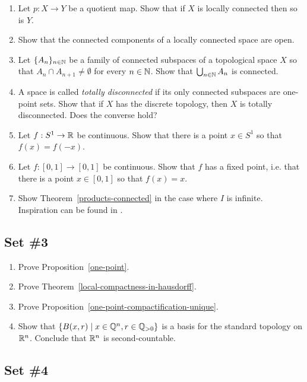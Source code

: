 \begin{enumerate}[label=2.\arabic*]
  \item Let $p : X \to Y$ be a quotient map. Show that if $X$ is locally connected then so is $Y$.
  \item \label{locally-connected-open} Show that the connected components of a locally connected space are open.
  \item Let $\{A_n\}_{n \in \mathbb{N}}$ be a family of connected subspaces of a topological space $X$ so that $A_n \cap A_{n+1} \not= \emptyset$ for every $n \in \mathbb{N}$. Show that $\bigcup_{n \in \mathbb{N}} A_n$ is connected.
  \item A space is called \emph{totally disconnected} if its only connected subspaces are one-point sets. Show that if $X$ has the discrete topology, then $X$ is totally disconnected. Does the converse hold?
  \item Let $f : S^1 \to \mathbb{R}$ be continuous. Show that there is a point $x \in S^1$ so that $f(x) = f(-x)$.
  \item Let $f : [0,1] \to [0,1]$ be continuous. Show that $f$ has a fixed point, i.e. that there is a point $x \in [0,1]$ so that $f(x) = x$.
  \item \label{exercise-products-connected} Show Theorem~\ref{products-connected} in the case where $I$ is infinite. Inspiration can be found in \cite[Ex.~23.7]{Mun}.
\end{enumerate}

\subsection{Set \#3}
  \begin{enumerate}[label=3.\arabic*]
    \item \label{one-point-exercise}Prove Proposition~\ref{one-point}.
    \item \label{local-compactness-in-hausdorff-exercise}Prove Theorem~\ref{local-compactness-in-hausdorff}.
    \item \label{one-point-compactification-unique-exercise}Prove Proposition~\ref{one-point-compactification-unique}.
    \item \label{second-countable-exercise}Show that $\{B(x,r) \mid x \in \mathbb{Q}^n, r \in \mathbb{Q}_{> 0}\}$ is a basis for the standard topology on $\mathbb{R}^n$. Conclude that $\mathbb{R}^n$ is second-countable.
  \end{enumerate}
\subsection{Set \#4}
